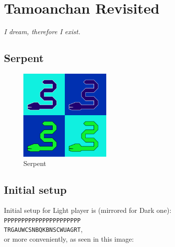 \documentclass[a5paper,12pt,draft]{book} %
\begin{document}
\clearpage

\chapter*{Tamoanchan Revisited}

\begin{flushright}
\parbox{0.6\textwidth}{
\emph{I dream, therefore I exist. \\
 } }
\end{flushright}

\section*{Serpent}

\noindent
\begin{figure}
\includegraphics[width=0.4\textwidth, keepaspectratio=true]{../gfx/pieces/13_serpent.png}
\caption{Serpent}
\label{fig:serpent}
\end{figure}

\clearpage

\section*{Initial setup}

Initial setup for Light player is (mirrored for Dark one):
\texttt{PPPPPPPPPPPPPPPPPPPPPP \\
        TRGAUWCSNBQKBNSCWUAGRT}, \\
or more conveniently, as seen in this image:
\end{document}
